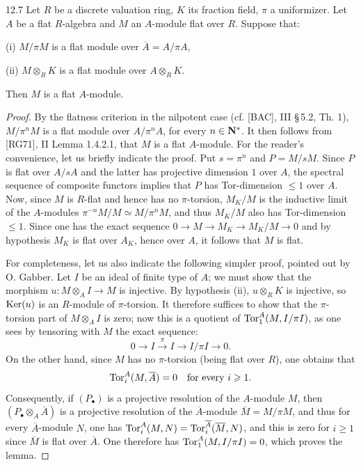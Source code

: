 \begin{lemma}{12.7}\label{VIB.12.7}
Let $R$ be a discrete valuation ring, $K$ its fraction field, $\pi$ a uniformizer. Let $A$ be a flat $R$-algebra and $M$ an $A$-module flat over $R$. Suppose that:

(i) $M/\pi M$ is a flat module over $\overline A=A/\pi A$,

(ii) $M\otimes_R K$ is a flat module over $A\otimes_R K$.

Then $M$ is a flat $A$-module.
\end{lemma}
\begin{proof}
By the flatness criterion in the nilpotent case (cf. [BAC], III \S\,5.2, Th. 1), $M/\pi^n M$ is a flat module over $A/\pi^n A$, for every $n\in\mathbf{N}^*$. It then follows from [RG71], II Lemma 1.4.2.1, that $M$ is a flat $A$-module. For the reader's convenience, let us briefly indicate the proof. Put $s=\pi^n$ and $P=M/sM$. Since $P$ is flat over $A/sA$ and the latter has projective dimension $1$ over $A$, the spectral sequence of composite functors implies that $P$ has Tor-dimension $\leq1$ over $A$. Now, since $M$ is $R$-flat and hence has no $\pi$-torsion, $M_K/M$ is the inductive limit of the $A$-modules $\pi^{-n}M/M\simeq M/\pi^n M$, and thus $M_K/M$ also has Tor-dimension $\leq1$. Since one has the exact sequence $0\to M\to M_K\to M_K/M\to0$ and by hypothesis $M_K$ is flat over $A_K$, hence over $A$, it follows that $M$ is flat.

For completeness, let us also indicate the following simpler proof, pointed out by O. Gabber. Let $I$ be an ideal of finite type of $A$; we must show that the morphism $u:M\otimes_A I\to M$ is injective. By hypothesis (ii), $u\otimes_R K$ is injective, so $\operatorname{Ker}(u)$ is an $R$-module of $\pi$-torsion. It therefore suffices to show that the $\pi$-torsion part of $M\otimes_A I$ is zero; now this is a quotient of $\operatorname{Tor}_1^A(M,I/\pi I)$, as one sees by tensoring with $M$ the exact sequence:
\[
0\to I\xrightarrow{\pi}I\to I/\pi I\to0.
\]
On the other hand, since $M$ has no $\pi$-torsion (being flat over $R$), one obtains that
\[
\operatorname{Tor}_i^A(M,\overline A)=0\quad\text{for every }i\geqslant1.
\]
Consequently, if $(P_\bullet)$ is a projective resolution of the $A$-module $M$, then $(P_\bullet\otimes_A\overline A)$ is a projective resolution of the $\overline A$-module $\overline M=M/\pi M$, and thus for every $\overline A$-module $N$, one has $\operatorname{Tor}_i^A(M,N)=\operatorname{Tor}_i^{\overline A}(\overline M,N)$, and this is zero for $i\geq1$ since $\overline M$ is flat over $\overline A$. One therefore has $\operatorname{Tor}_1^A(M,I/\pi I)=0$, which proves the lemma.
\end{proof}
